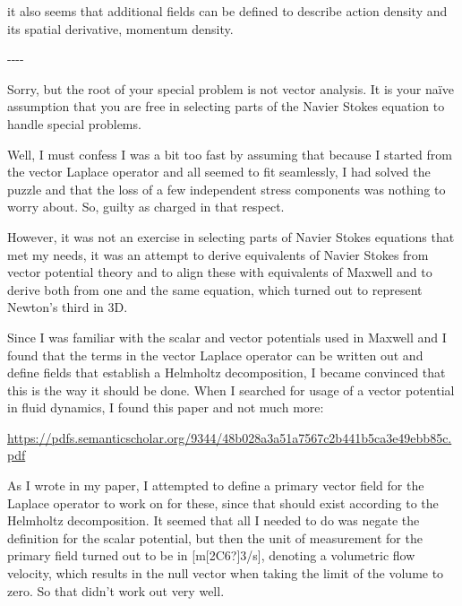 \documentclass[a4paper]{article}
\newcommand\textstyleNone[1]{#1}
\begin{document}
{\color[rgb]{0.101960786,0.101960786,0.101960786}
\textstyleNone{it also seems that additional fields can be defined to describe action density and its spatial
derivative, momentum density.}}

{\centering\color[rgb]{0.101960786,0.101960786,0.101960786}
\textstyleNone{{}-{}-{}-{}-}
\par}

{\color[rgb]{0.101960786,0.101960786,0.101960786}
\textstyleNone{{\textquotedbl}Sorry, but the root of your special problem is not vector analysis. It is your na\"ive
assumption that you are free in selecting parts of the Navier Stokes equation to handle special
problems.{\textquotedbl}}}

{\color[rgb]{0.101960786,0.101960786,0.101960786}
\textstyleNone{Well, I must confess I was a bit too fast by assuming that because I started from the vector Laplace
operator and all seemed to fit seamlessly, I had solved the puzzle and that the loss of a few independent stress
components was nothing to worry about. So, guilty as charged in that respect.  }}

{\color[rgb]{0.101960786,0.101960786,0.101960786}
\textstyleNone{However, it was not an exercise in selecting parts of Navier Stokes equations that met my needs, it was
an attempt to derive equivalents of Navier Stokes from vector potential theory and to align these with equivalents of
Maxwell and to derive both from one and the same equation, which turned out to represent Newton's third in 3D.}}

{\color[rgb]{0.101960786,0.101960786,0.101960786}
\textstyleNone{Since I was familiar with the scalar and vector potentials used in Maxwell and I found that the terms in
the vector Laplace operator can be written out and define fields that establish a Helmholtz decomposition, I became
convinced that this is the way it should be done. When I searched for usage of a vector potential in fluid dynamics, I
found this paper and not much more: }}

{\color[rgb]{0.101960786,0.101960786,0.101960786}
\url{https://pdfs.semanticscholar.org/9344/48b028a3a51a7567c2b441b5ca3e49ebb85c.pdf}\textstyleNone{ }}

{\color[rgb]{0.101960786,0.101960786,0.101960786}
\textstyleNone{As I wrote in my paper, I attempted to define a primary vector field for the Laplace operator to work on
for these, since that should exist according to the Helmholtz decomposition. It seemed that all I needed to do was
negate the definition for the scalar potential, but then the unit of measurement for the primary field turned out to be
in [m[2C6?]3/s], denoting a volumetric flow velocity, which results in the null vector when taking the limit of the
volume to zero. So that didn't work out very well.}}
\end{document}
